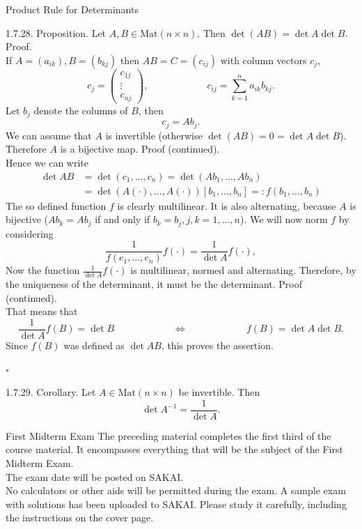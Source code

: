 \documentclass[smaller,hyperref={CJKbookmarks=true}]{beamer}
\begin{document}
\begin{frame}{Product Rule for Determinants}
\begin{spacing}{1.1}
\alert{1.7.28. Proposition.} Let $A,B\in\text{Mat}(n\times n)$. Then $\det(AB)=\det A\det B$.\\[6pt]
\alert{Proof.}\\
If $A=(a_{ik}),B=(b_{kj})$ then $AB=C=(c_{ij})$ with column vectors $c_j$,
\[c_j=\begin{pmatrix}
        c_{1j} \\
        \vdots \\
        c_{nj}
      \end{pmatrix},\qquad\qquad\qquad c_{ij}=\sum_{k=1}^{n}a_{ik}b_{kj}.\]
Let $b_j$ denote the columns of $B$, then
\[c_j=Ab_j.\]
We can assume that $A$ is invertible (otherwise $\det(AB)=0=\det A\det B$). Therefore $A$ is a bijective map.
\newpage
\alert{Proof (continued).}\\
Hence we can write
\begin{equation*}
  \begin{split}
     \det AB &=\det(c_1,\ldots,c_n)=\det(Ab_1,\ldots,Ab_n) \\
       &=\det(A(\cdot),\ldots,A(\cdot))[b_1,\ldots,b_n]=:f(b_1,\ldots,b_n)
  \end{split}
\end{equation*}
The so defined function $f$ is clearly multilinear. It is also alternating, because $A$ is bijective ($Ab_k=Ab_j$ if and only if $b_k=b_j,j,k=1,\ldots,n$). We will now norm $f$ by considering
\[\frac{1}{f(e_1,\ldots,e_n)}f(\cdot)=\frac{1}{\det A}f(\cdot),\]
Now the function $\frac{1}{\det A}f(\cdot)$ is multilinear, normed and alternating. Therefore, by the uniqueness of the determinant, it must be the determinant.
\newpage
\vspace*{18pt}
\alert{Proof (continued).}\\
That means that
\[\frac{1}{\det A}f(B)=\det B\qquad\qquad\qquad\Leftrightarrow\qquad\qquad\qquad f(B)=\det A\det B.\]
Since $f(B)$ was defined as $\det AB$, this proves the assertion.
\begin{flushright}
  $\square$
\end{flushright}
\alert{1.7.29. Corollary.} Let $A\in\text{Mat}(n\times n)$ be invertible. Then
\[\det A^{-1}=\frac{1}{\det A}.\]
\end{spacing}
\end{frame}
\begin{frame}[c]{First Midterm Exam}
The preceding material completes the first third of the course material. It
encompasses everything that will be the subject of the \textcolor[rgb]{1.00,0.00,0.00}{First Midterm Exam}.\\[8pt]
The exam date will be posted on SAKAI.\\[8pt]
No calculators or other aids will be permitted during the exam. A sample
exam with solutions has been uploaded to SAKAI. Please study it carefully,
including the instructions on the cover page.
\end{frame}
\end{document}
